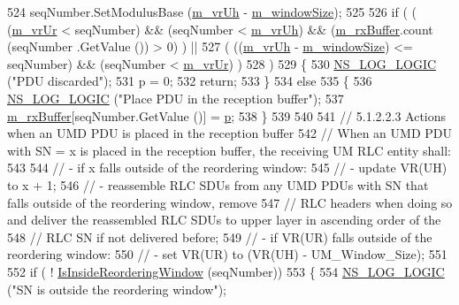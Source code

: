 \begin{DoxyCode}
524   seqNumber.SetModulusBase (\hyperlink{classns3_1_1LteRlcUmLowLat_aa5ff652a885ef59bdda2446f6abd3cd8}{m\_vrUh} - \hyperlink{classns3_1_1LteRlcUmLowLat_aecfdc0c06f03a1aa8958f06e077fd2fd}{m\_windowSize});
525 
526   \textcolor{keywordflow}{if} ( ( (\hyperlink{classns3_1_1LteRlcUmLowLat_a614417e6259a873e3d2dbde0d67a1df6}{m\_vrUr} < seqNumber) && (seqNumber < \hyperlink{classns3_1_1LteRlcUmLowLat_aa5ff652a885ef59bdda2446f6abd3cd8}{m\_vrUh}) && (\hyperlink{classns3_1_1LteRlcUmLowLat_aedc712a69598a77115ae9a67133b53d8}{m\_rxBuffer}.count (seqNumber
      .GetValue ()) > 0) ) ||
527        ( ((\hyperlink{classns3_1_1LteRlcUmLowLat_aa5ff652a885ef59bdda2446f6abd3cd8}{m\_vrUh} - \hyperlink{classns3_1_1LteRlcUmLowLat_aecfdc0c06f03a1aa8958f06e077fd2fd}{m\_windowSize}) <= seqNumber) && (seqNumber < 
      \hyperlink{classns3_1_1LteRlcUmLowLat_a614417e6259a873e3d2dbde0d67a1df6}{m\_vrUr}) )
528      )
529     \{
530       \hyperlink{group__logging_ga88acd260151caf2db9c0fc84997f45ce}{NS\_LOG\_LOGIC} (\textcolor{stringliteral}{"PDU discarded"});
531       p = 0;
532       \textcolor{keywordflow}{return};
533     \}
534   \textcolor{keywordflow}{else}
535     \{
536       \hyperlink{group__logging_ga88acd260151caf2db9c0fc84997f45ce}{NS\_LOG\_LOGIC} (\textcolor{stringliteral}{"Place PDU in the reception buffer"});
537       \hyperlink{classns3_1_1LteRlcUmLowLat_aedc712a69598a77115ae9a67133b53d8}{m\_rxBuffer}[seqNumber.GetValue ()] = \hyperlink{lte__link__budget_8m_ac9de518908a968428863f829398a4e62}{p};
538     \}
539 
540 
541   \textcolor{comment}{// 5.1.2.2.3 Actions when an UMD PDU is placed in the reception buffer}
542   \textcolor{comment}{// When an UMD PDU with SN = x is placed in the reception buffer, the receiving UM RLC entity shall:}
543 
544   \textcolor{comment}{// - if x falls outside of the reordering window:}
545   \textcolor{comment}{//    - update VR(UH) to x + 1;}
546   \textcolor{comment}{//    - reassemble RLC SDUs from any UMD PDUs with SN that falls outside of the reordering window, remove}
547   \textcolor{comment}{//      RLC headers when doing so and deliver the reassembled RLC SDUs to upper layer in ascending order
       of the}
548   \textcolor{comment}{//      RLC SN if not delivered before;}
549   \textcolor{comment}{//    - if VR(UR) falls outside of the reordering window:}
550   \textcolor{comment}{//        - set VR(UR) to (VR(UH) - UM\_Window\_Size);}
551 
552   \textcolor{keywordflow}{if} ( ! \hyperlink{classns3_1_1LteRlcUmLowLat_aae57ed7d1b7b9bff39ac4e70cddfbd80}{IsInsideReorderingWindow} (seqNumber))
553     \{
554       \hyperlink{group__logging_ga88acd260151caf2db9c0fc84997f45ce}{NS\_LOG\_LOGIC} (\textcolor{stringliteral}{"SN is outside the reordering window"});

\end{DoxyCode}
